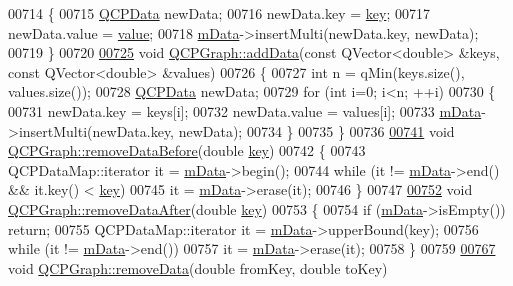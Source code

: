 \begin{DoxyCode}
00714 \{
00715   \hyperlink{a00030_d2/d94/a00184}{QCPData} newData;
00716   newData.key = \hyperlink{a00116_a94bb892c30911cd62cba0707a5395be4}{key};
00717   newData.value = \hyperlink{a00116_aee90379adb0307effb138f4871edbc5c}{value};
00718   \hyperlink{a00031_a8457c840f69a0ac49f61d30a509c5d08}{mData}->insertMulti(newData.key, newData);
00719 \}
00720 
\hypertarget{a00115_source_l00725}{}\hyperlink{a00031_ab6da6377541fe80d892a9893a92db9c6}{00725} \textcolor{keywordtype}{void} \hyperlink{a00031_aa5c6181d84db72ce4dbe9dc15a34ef4f}{QCPGraph::addData}(\textcolor{keyword}{const} QVector<double> &keys, \textcolor{keyword}{const} QVector<double> &values)
00726 \{
00727   \textcolor{keywordtype}{int} n = qMin(keys.size(), values.size());
00728   \hyperlink{a00030_d2/d94/a00184}{QCPData} newData;
00729   \textcolor{keywordflow}{for} (\textcolor{keywordtype}{int} i=0; i<n; ++i)
00730   \{
00731     newData.key = keys[i];
00732     newData.value = values[i];
00733     \hyperlink{a00031_a8457c840f69a0ac49f61d30a509c5d08}{mData}->insertMulti(newData.key, newData);
00734   \}
00735 \}
00736 
\hypertarget{a00115_source_l00741}{}\hyperlink{a00031_a9fe0b3e54e8c7b61319bd03337e21e99}{00741} \textcolor{keywordtype}{void} \hyperlink{a00031_a9fe0b3e54e8c7b61319bd03337e21e99}{QCPGraph::removeDataBefore}(\textcolor{keywordtype}{double} \hyperlink{a00116_a94bb892c30911cd62cba0707a5395be4}{key})
00742 \{
00743   QCPDataMap::iterator it = \hyperlink{a00031_a8457c840f69a0ac49f61d30a509c5d08}{mData}->begin();
00744   \textcolor{keywordflow}{while} (it != \hyperlink{a00031_a8457c840f69a0ac49f61d30a509c5d08}{mData}->end() && it.key() < \hyperlink{a00116_a94bb892c30911cd62cba0707a5395be4}{key})
00745     it = \hyperlink{a00031_a8457c840f69a0ac49f61d30a509c5d08}{mData}->erase(it);
00746 \}
00747 
\hypertarget{a00115_source_l00752}{}\hyperlink{a00031_ae42d645ef617cfc75fc0df58e62c522a}{00752} \textcolor{keywordtype}{void} \hyperlink{a00031_ae42d645ef617cfc75fc0df58e62c522a}{QCPGraph::removeDataAfter}(\textcolor{keywordtype}{double} \hyperlink{a00116_a94bb892c30911cd62cba0707a5395be4}{key})
00753 \{
00754   \textcolor{keywordflow}{if} (\hyperlink{a00031_a8457c840f69a0ac49f61d30a509c5d08}{mData}->isEmpty()) \textcolor{keywordflow}{return};
00755   QCPDataMap::iterator it = \hyperlink{a00031_a8457c840f69a0ac49f61d30a509c5d08}{mData}->upperBound(key);
00756   \textcolor{keywordflow}{while} (it != \hyperlink{a00031_a8457c840f69a0ac49f61d30a509c5d08}{mData}->end())
00757     it = \hyperlink{a00031_a8457c840f69a0ac49f61d30a509c5d08}{mData}->erase(it);
00758 \}
00759 
\hypertarget{a00115_source_l00767}{}\hyperlink{a00031_a4a0fde50b7db9db0a85b5c5b6b10098f}{00767} \textcolor{keywordtype}{void} \hyperlink{a00031_a4a0fde50b7db9db0a85b5c5b6b10098f}{QCPGraph::removeData}(\textcolor{keywordtype}{double} fromKey, \textcolor{keywordtype}{double} toKey)

\end{DoxyCode}
